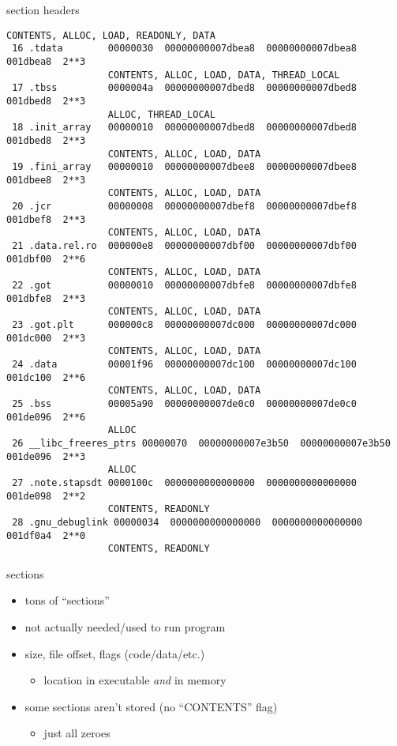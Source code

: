 \begin{frame}[fragile,label=sectHeader]{section headers}
\begin{Verbatim}[fontsize=\tiny]
                  CONTENTS, ALLOC, LOAD, READONLY, DATA
 16 .tdata        00000030  00000000007dbea8  00000000007dbea8  001dbea8  2**3
                  CONTENTS, ALLOC, LOAD, DATA, THREAD_LOCAL
 17 .tbss         0000004a  00000000007dbed8  00000000007dbed8  001dbed8  2**3
                  ALLOC, THREAD_LOCAL
 18 .init_array   00000010  00000000007dbed8  00000000007dbed8  001dbed8  2**3
                  CONTENTS, ALLOC, LOAD, DATA
 19 .fini_array   00000010  00000000007dbee8  00000000007dbee8  001dbee8  2**3
                  CONTENTS, ALLOC, LOAD, DATA
 20 .jcr          00000008  00000000007dbef8  00000000007dbef8  001dbef8  2**3
                  CONTENTS, ALLOC, LOAD, DATA
 21 .data.rel.ro  000000e8  00000000007dbf00  00000000007dbf00  001dbf00  2**6
                  CONTENTS, ALLOC, LOAD, DATA
 22 .got          00000010  00000000007dbfe8  00000000007dbfe8  001dbfe8  2**3
                  CONTENTS, ALLOC, LOAD, DATA
 23 .got.plt      000000c8  00000000007dc000  00000000007dc000  001dc000  2**3
                  CONTENTS, ALLOC, LOAD, DATA
 24 .data         00001f96  00000000007dc100  00000000007dc100  001dc100  2**6
                  CONTENTS, ALLOC, LOAD, DATA
 25 .bss          00005a90  00000000007de0c0  00000000007de0c0  001de096  2**6
                  ALLOC
 26 __libc_freeres_ptrs 00000070  00000000007e3b50  00000000007e3b50  001de096  2**3
                  ALLOC
 27 .note.stapsdt 0000100c  0000000000000000  0000000000000000  001de098  2**2
                  CONTENTS, READONLY
 28 .gnu_debuglink 00000034  0000000000000000  0000000000000000  001df0a4  2**0
                  CONTENTS, READONLY
\end{Verbatim}
\end{frame}

\begin{frame}{sections}
\begin{itemize}
\item tons of ``sections''
\item not actually needed/used to run program
\item size, file offset, flags (code/data/etc.)
    \begin{itemize}
    \item location in executable \textit{and} in memory
    \end{itemize}
\item some sections aren't stored (no ``CONTENTS'' flag) 
    \begin{itemize}
    \item just all zeroes
    \end{itemize}
\end{itemize}
\end{frame}

